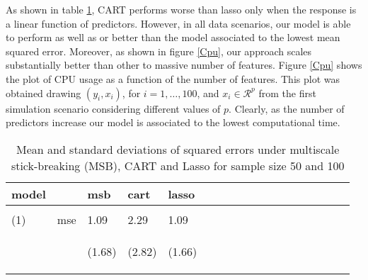 \documentclass{article}
\begin{document}
As shown in table \ref{table1}, CART performs worse than lasso only when the response is a linear function of predictors. However, in all data scenarios, our model is able to perform as well as or better than the model associated to the lowest mean squared error. Moreover, as shown in figure \ref{Cpu}, our approach scales substantially better than other to massive number of features. Figure \ref{Cpu} shows the plot of CPU usage as a function of the number of features. This plot was obtained drawing $(y_i, x_i)$, for $i=1, \ldots, 100$, and $x_i \in \mathcal{R}^p$  from the first simulation scenario considering different values of $p$. Clearly, as the number of predictors increase our model is associated to the lowest computational time.
\begin{table}[t]
\caption{Mean and standard deviations of squared errors under multiscale stick-breaking (MSB), CART and Lasso for sample size 50 and 100}
\label{table1} \vskip 0.15in \begin{center} \begin{small} \begin{sc}
\begin{tabular}{llllllllllllllllll}
\hline
\abovespace\belowspace
 model&& msb&cart&lasso\\
\hline
\\
(1)&mse&     1.09 & 2.29 & 1.09\\
& & \begin{scriptsize} (1.68)\end{scriptsize} & \begin{scriptsize} (2.82)\end{scriptsize}& \begin{scriptsize} (1.66)\end{scriptsize}\\


\end{tabular}
\end{sc}
\end{small}
\end{center}
\end{table}
\end{document}
